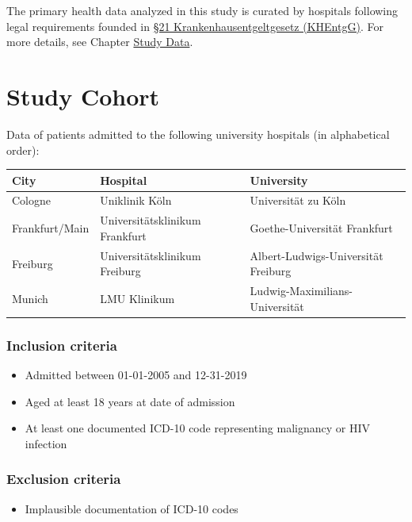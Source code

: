 \documentclass[
  letterpaper,
  DIV=11,
  numbers=noendperiod]{scrreprt}
\providecommand{\tightlist}{%
  \setlength{\itemsep}{0pt}\setlength{\parskip}{0pt}}\usepackage{longtable,booktabs,array}
\begin{document}
The primary health data analyzed in this study is curated by hospitals
following legal requirements founded in
\href{https://www.gesetze-im-internet.de/khentgg/__21.html}{§21
Krankenhausentgeltgesetz (KHEntgG)}. For more details, see Chapter
\protect\hyperlink{chapter-StudyData}{Study Data}.

\hypertarget{section-StudyCohort}{%
\section{Study Cohort}\label{section-StudyCohort}}

Data of patients admitted to the following university hospitals (in
alphabetical order):

\begin{longtable*}{lll}
\toprule
City & Hospital & University \\ 
\midrule
Cologne & Uniklinik Köln & Universität zu Köln \\ 
Frankfurt/Main & Universitätsklinikum Frankfurt & Goethe-Universität Frankfurt \\ 
Freiburg & Universitätsklinikum Freiburg & Albert-Ludwigs-Universität Freiburg \\ 
Munich & LMU Klinikum & Ludwig-Maximilians-Universität \\ 
\bottomrule
\end{longtable*}

\hypertarget{inclusion-criteria}{%
\subsubsection{Inclusion criteria}\label{inclusion-criteria}}

\begin{itemize}
\tightlist
\item
  Admitted between 01-01-2005 and 12-31-2019
\item
  Aged at least 18 years at date of admission
\item
  At least one documented ICD-10 code representing malignancy or HIV
  infection
\end{itemize}

\hypertarget{exclusion-criteria}{%
\subsubsection{Exclusion criteria}\label{exclusion-criteria}}

\begin{itemize}
\tightlist
\item
  Implausible documentation of ICD-10 codes
\end{itemize}
\end{document}
